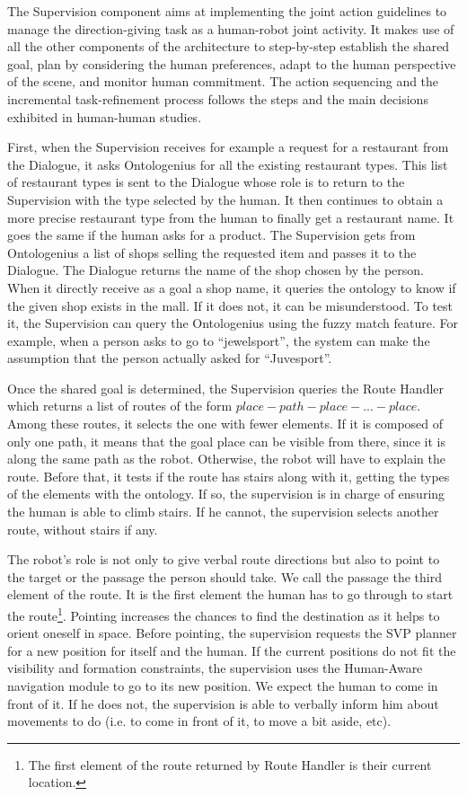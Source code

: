The Supervision component aims at implementing the joint action guidelines to manage the direction-giving task as a human-robot joint activity. It makes use of all the other components of the architecture to step-by-step establish the shared goal, plan by considering the human preferences, adapt to the human perspective of the scene, and monitor human commitment. The action sequencing and the incremental task-refinement process follows the steps and the main decisions exhibited in human-human studies. 

First, when the Supervision receives for example a request for a restaurant from the Dialogue, it asks Ontologenius for all the existing restaurant types. This list of restaurant types is sent to the Dialogue whose role is to return to the Supervision with the type selected by the human. It then continues to obtain a more precise restaurant type from the human to finally get a restaurant name. It goes the same if the human asks for a product. The Supervision gets from Ontologenius a list of shops selling the requested item and passes it to the Dialogue. The Dialogue returns the name of the shop chosen by the person. When it directly receive as a goal a shop name, it queries the ontology to know if the given shop exists in the mall. If it does not, it can be misunderstood. To test it, the Supervision can query the Ontologenius using the fuzzy match feature. For example, when a person asks to go to ``jewelsport'', the system can make the assumption that the person actually asked for ``Juvesport''.

\newpage

Once the shared goal is determined, the Supervision queries the Route Handler which returns a list of routes of the form $place - path - place - ... - place$. Among these routes, it selects the one with fewer elements. If it is composed of only one path, it means that the goal place can be visible from there, since it is along the same path as the robot. Otherwise, the robot will have to explain the route. Before that, it tests if the route has stairs along with it, getting the types of the elements with the ontology. If so, the supervision is in charge of ensuring the human is able to climb stairs. If he cannot, the supervision selects another route, without stairs if any.

The robot's role is not only to give verbal route directions but also to point to the target or the passage the person should take. We call the passage the third element of the route. It is the first element the human has to go through to start the route\footnote{The first element of the route returned by Route Handler is their current location.}. Pointing increases the chances to find the destination as it helps to orient oneself in space. Before pointing, the supervision requests the SVP planner for a new position for itself and the human. If the current positions do not fit the visibility and formation constraints, the supervision uses the Human-Aware navigation module to go to its new position. We expect the human to come in front of it. If he does not, the supervision is able to verbally inform him about movements to do (i.e. to come in front of it, to move a bit aside, etc).

